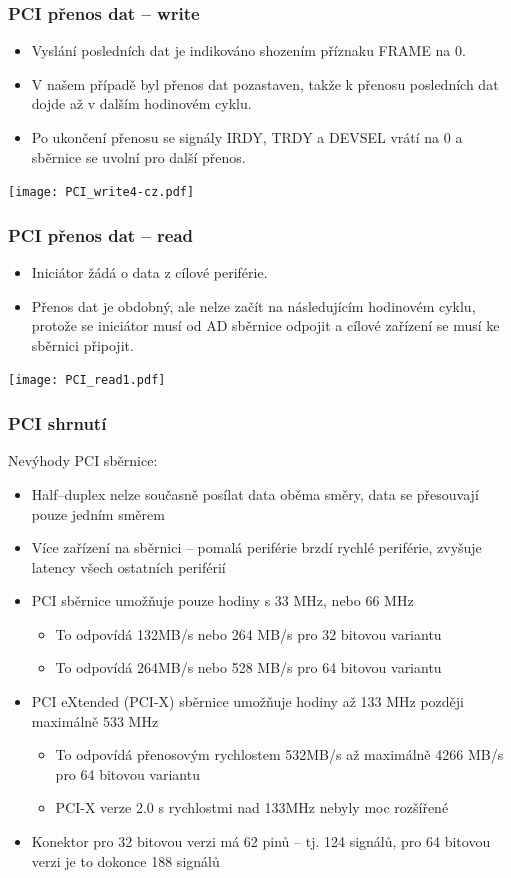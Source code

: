 \documentclass{beamer}
\begin{document}
\begin{frame}
\frametitle{PCI přenos dat -- write}

\begin{itemize}
\item Vyslání posledních dat je indikováno shozením příznaku FRAME na 0.
\item V našem případě byl přenos dat pozastaven, takže k přenosu posledních dat dojde až v dalším hodinovém cyklu.
\item Po ukončení přenosu se signály IRDY, TRDY a DEVSEL vrátí na 0 a sběrnice se uvolní pro další přenos.
\end{itemize}

\texttt{[image: PCI\_write4-cz.pdf]}

\end{frame}


\begin{frame}
\frametitle{PCI přenos dat -- read}

\begin{itemize}
\item Iniciátor žádá o data z cílové periférie.
\item Přenos dat je obdobný, ale nelze začít na následujícím hodinovém cyklu, protože se iniciátor musí od AD sběrnice odpojit a cílové zařízení se musí ke sběrnici připojit.
\end{itemize}

\texttt{[image: PCI\_read1.pdf]}

\end{frame}


\begin{frame}
\frametitle{PCI shrnutí}

Nevýhody PCI sběrnice:
\begin{itemize}
\item Half--duplex nelze současně posílat data oběma směry, data se přesouvají pouze jedním směrem
\item Více zařízení na sběrnici -- pomalá periférie brzdí rychlé periférie, zvyšuje latency všech ostatních periférií
\item PCI sběrnice umožňuje pouze hodiny s 33 MHz, nebo 66 MHz
\begin{itemize}
\item To odpovídá 132MB/s nebo 264 MB/s pro 32 bitovou variantu
\item To odpovídá 264MB/s nebo 528 MB/s pro 64 bitovou variantu
\end{itemize}
\item PCI eXtended (PCI-X) sběrnice umožňuje hodiny až 133 MHz později maximálně 533 MHz
\begin{itemize}
\item To odpovídá přenosovým rychlostem 532MB/s až maximálně 4266 MB/s pro 64 bitovou variantu
\item PCI-X verze 2.0 s rychlostmi nad 133MHz nebyly moc rozšířené 
\end{itemize}
\item Konektor pro 32 bitovou verzi má 62 pinů -- tj. 124 signálů, pro 64 bitovou verzi je to dokonce 188 signálů  
\end{itemize}

\end{frame}
\end{document}
